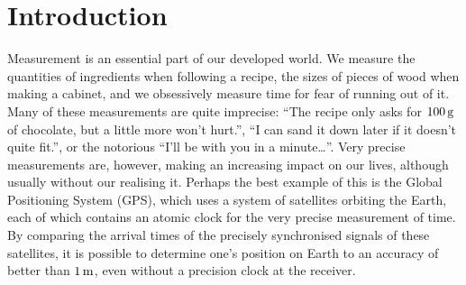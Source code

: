 \chapter{Introduction}
\label{Introduction}
\graphicspath{{Figures/Introduction/}{Figures/Common/}}




Measurement is an essential part of our developed world.  We measure the quantities of ingredients when following a recipe, the sizes of pieces of wood when making a cabinet, and we obsessively measure time for fear of running out of it.  Many of these measurements are quite imprecise: ``The recipe only asks for $\unit[100]{g}$ of chocolate, but a little more won't hurt.'', ``I can sand it down later if it doesn't quite fit.'', or the notorious ``I'll be with you in a minute\dots''.  Very precise measurements are, however, making an increasing impact on our lives, although usually without our realising it.  Perhaps the best example of this is the Global Positioning System (GPS), which uses a system of satellites orbiting the Earth, each of which contains an atomic clock for the very precise measurement of time.  By comparing the arrival times of the precisely synchronised signals of these satellites, it is possible to determine one's position on Earth to an accuracy of better than $\unit[1]{m}$, even without a precision clock at the receiver.


